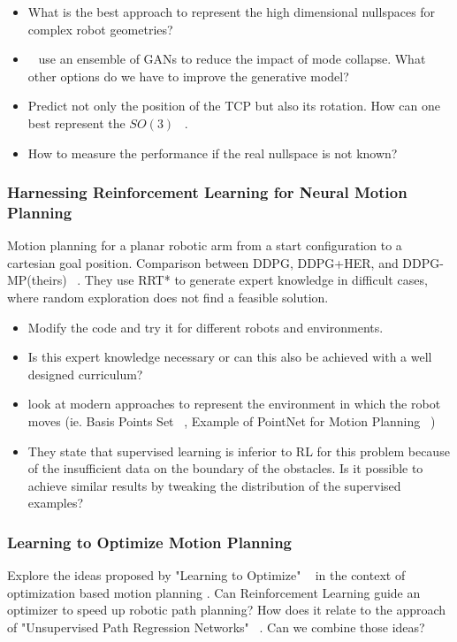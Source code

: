 \documentclass[a4paper]{article}
\begin{document}
\begin{itemize}
  \item What is the best approach to represent the high dimensional nullspaces for complex robot geometries?
  \item ~\cite{Lembono2021} use an ensemble of GANs to reduce the impact of mode collapse.
        What other options do we have to improve the generative model?
  \item Predict not only the position of the TCP but also its rotation. 
  How can one best represent the $SO(3)$ ~\cite{Zhou2018}.
  \item How to measure the performance if the real nullspace is not known?
\end{itemize}

\subsubsection{Harnessing Reinforcement Learning for Neural Motion Planning}
Motion planning for a planar robotic arm from a start configuration to a cartesian goal position.
Comparison between DDPG, DDPG+HER, and DDPG-MP(theirs) ~\cite{Jurgenson2019}.
They use RRT* to generate expert knowledge in difficult cases, where random exploration does not find a feasible solution.
\begin{itemize}
  \item Modify the code and try it for different robots and environments.
  \item Is this expert knowledge necessary or can this also be achieved with a well designed curriculum?
  \item look at modern approaches to represent the environment in which the robot moves (ie. Basis Points Set ~\cite{Prokudin2019}, Example of PointNet for Motion Planning ~\cite{Strudel2020})
  \item They state that supervised learning is inferior to RL for this problem because of the insufficient data on the boundary of the obstacles. Is it possible to achieve similar results by tweaking the distribution of the supervised examples?
\end{itemize}


\subsubsection{Learning to Optimize Motion Planning}
Explore the ideas proposed by "Learning to Optimize" ~\cite{LiM16b} in the context of optimization based motion planning \cite{Zucker2013}.
Can Reinforcement Learning guide an optimizer to speed up robotic path planning?
How does it relate to the approach of "Unsupervised Path Regression Networks" ~\cite{Pandy2020}.
Can we combine those ideas?
\end{document}
